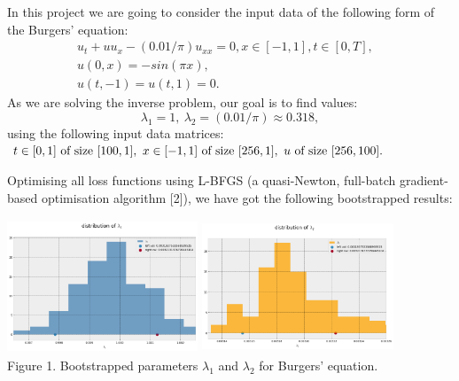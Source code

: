 \documentclass{beamer}
\begin{document}
\begin{frame}
In this project we are going to consider the input data of the following form of the Burgers' equation:
\begin{align}

u_t + u u_x - (0.01/\pi)u_{xx} = 0, x \in [-1, 1], t \in [0, T], &\\
u(0, x) = -sin(\pi x), & \\
u(t, -1) = u(t, 1) = 0.
\end{align}
As we are solving the inverse problem, our goal is to find values:
$$\lambda_1 = 1, ~ \lambda_2 = (0.01 / \pi) \approx 0.318, $$ using the following input data matrices:
$t \in [0, 1] \text{ of size } [100, 1], \\ ~ x \in [-1, 1] \text{ of size } [256, 1],~ u \text{ of size } [256, 100].$

\end{frame}

\begin{frame}

Optimising all loss functions using L-BFGS (a quasi-Newton, full-batch gradient-based optimisation algorithm [2]), we have got the following bootstrapped results:

\begin{center}
\includegraphics[width = 5.7cm , height = 4cm]{02-presentation-v1/images/l1_confidence.png}
\includegraphics[width = 5.7cm , height = 4cm]{02-presentation-v1/images/l2_confidence.png}
\\
\caption{Figure 1. Bootstrapped parameters $\lambda_1$ and $\lambda_2$ for Burgers' equation.}
\end{center}
\end{frame}
\end{document}
